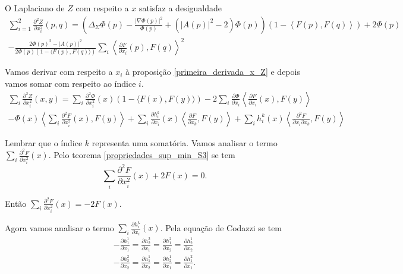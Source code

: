 \begin{proposicao}
	O Laplaciano de $Z$ com respeito a $x$ satisfaz a desigualdade
	\begin{multline*}
		\sum_{i=1}^{2} \frac{\partial^2 Z}{\partial x_i^2} (p,q) = \left( \Delta_{\Sigma} \Phi(p) - \frac{| \nabla \Phi(p) |^2}{\Phi(p)} + (|A(p)|^2 - 2) \Phi(p) \right) (1 - \left\langle F(p), F(q) \right\rangle) + 2 \Phi(p)\\
		 - \frac{2 \Phi(p)^2 - |A(p)|^2}{2 \Phi(p) (1 - \langle F(p), F(q) \rangle)} \sum_i \left\langle \frac{\partial F}{\partial x_i}(p), F(q) \right\rangle^2
	\end{multline*}
\end{proposicao}

\begin{demonstracao}
	Vamos derivar com respeito a $x_i$ à proposição \ref{primeira_derivada_x_Z} e depois vamos somar com respeito ao índice $i$.
	\begin{multline}\label{Z_seg_dev_x}
		\sum_i \frac{\partial^2 Z}{\partial x_i^2}(x,y) = \sum_i \frac{\partial^2 \Phi}{\partial x_i^2}(x)(1 - \langle F(x), F(y) \rangle) -2  \sum_i \frac{\partial \Phi}{\partial x_i} \left\langle \frac{\partial F}{\partial x_i}(x), F(y) \right\rangle\\
		 -  \Phi(x) \left\langle \sum_i \frac{\partial^2 F}{\partial x_i^2}(x), F(y) \right\rangle + \sum_i \frac{\partial h_i^k}{\partial x_i}(x) \left\langle \frac{\partial F}{\partial x_k}, F(y) \right\rangle + \sum_i h_i^k(x) \left\langle \frac{\partial^2 F}{\partial x_i \partial x_k}, F(y) \right\rangle
	\end{multline}
	
	Lembrar que o índice $k$ representa uma somatória. Vamos analisar o termo $\sum_i \frac{\partial^2 F}{\partial x_i^2}(x)$. Pelo teorema \ref{propriedades_sup_min_S3} se tem
	\begin{equation*}
		\sum_i \frac{\partial^2 F}{\partial x_i^2}(x) + 2 F(x) = 0.
	\end{equation*}
	
	Então $\sum_i \frac{\partial^2 F}{\partial x_i^2}(x) = -2 F(x) $.
	
	Agora vamos analisar o termo $\sum_i \frac{\partial h_i^k}{\partial x_i}(x)$. Pela equação de Codazzi se tem
	\begin{equation}\label{codazzi_eq}
		\begin{split}
		-\frac{\partial h_1^1}{\partial x_1} = \frac{\partial h_2^2}{\partial x_1} = \frac{\partial h_1^2}{\partial x_2} = \frac{\partial h_2^1}{\partial x_2}\\
		-\frac{\partial h_2^2}{\partial x_2} = \frac{\partial h_1^1}{\partial x_2} = \frac{\partial h_2^1}{\partial x_1} = \frac{\partial h_1^2}{\partial x_1}.
		\end{split}		
	\end{equation}
	

\end{demonstracao}
